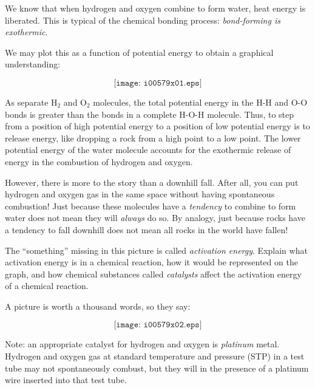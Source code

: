 

We know that when hydrogen and oxygen combine to form water, heat energy is liberated.  This is typical of the chemical bonding process: {\it bond-forming is exothermic}.

We may plot this as a function of potential energy to obtain a graphical understanding:

$$\texttt{[image: i00579x01.eps]}$$

As separate H$_{2}$ and O$_{2}$ molecules, the total potential energy in the H-H and O-O bonds is greater than the bonds in a complete H-O-H molecule.  Thus, to step from a position of high potential energy to a position of low potential energy is to release energy, like dropping a rock from a high point to a low point.  The lower potential energy of the water molecule accounts for the exothermic release of energy in the combustion of hydrogen and oxygen.

However, there is more to the story than a downhill fall.  After all, you can put hydrogen and oxygen gas in the same space without having spontaneous combustion!  Just because these molecules have a {\it tendency} to combine to form water does not mean they will {\it always} do so.  By analogy, just because rocks have a tendency to fall downhill does not mean all rocks in the world have fallen!

The ``something'' missing in this picture is called {\it activation energy}.  Explain what activation energy is in a chemical reaction, how it would be represented on the graph, and how chemical substances called {\it catalysts} affect the activation energy of a chemical reaction.







A picture is worth a thousand words, so they say:

$$\texttt{[image: i00579x02.eps]}$$

Note: an appropriate catalyst for hydrogen and oxygen is {\it platinum} metal.  Hydrogen and oxygen gas at standard temperature and pressure (STP) in a test tube may not spontaneously combust, but they will in the presence of a platinum wire inserted into that test tube.


